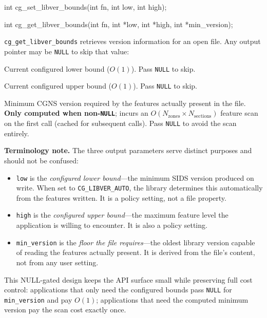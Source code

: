 \documentclass[11pt,letterpaper]{article}
\makeatletter
\let\cgns@orig@lstlisting\lstlisting
\let\cgns@endorig@lstlisting\endlstlisting
\renewenvironment{lstlisting}
  {\par\needspace{5\baselineskip}\nolinenumbers\cgns@orig@lstlisting}
  {\cgns@endorig@lstlisting\par\linenumbers}
\makeatother
\begin{document}
\begin{lstlisting}[language=C]
int cg_set_libver_bounds(int fn,
                               int low, int high);

int cg_get_libver_bounds(int fn,
                               int *low, int *high,
                               int *min_version);
\end{lstlisting}

\texttt{cg\_get\_libver\_bounds} retrieves version information
for an open file.  Any output pointer may be \texttt{NULL} to skip
that value:

\begin{description}[leftmargin=2em, font=\normalfont\ttfamily]
\item[low] Current configured lower bound ($O(1)$).  Pass
  \texttt{NULL} to skip.
\item[high] Current configured upper bound ($O(1)$).  Pass
  \texttt{NULL} to skip.
\item[min\_version] Minimum CGNS version required by the features
  actually present in the file.  \textbf{Only computed when
  non-\texttt{NULL}}; incurs an
  $O(N_{\mathrm{zones}} \times N_{\mathrm{sections}})$ feature scan
  on the first call (cached for subsequent calls).  Pass \texttt{NULL}
  to avoid the scan entirely.
\end{description}

\textbf{Terminology note.}  The three output parameters serve distinct
purposes and should not be confused:
\begin{itemize}[leftmargin=2em]
\item \texttt{low} is the \emph{configured lower bound}---the minimum
  SIDS version produced on write.  When set to
  \texttt{CG\_LIBVER\_AUTO}, the library determines this automatically
  from the features written.  It is a policy setting, not a file
  property.
\item \texttt{high} is the \emph{configured upper bound}---the maximum
  feature level the application is willing to encounter.  It is also
  a policy setting.
\item \texttt{min\_version} is the \emph{floor the file requires}---the
  oldest library version capable of reading the features actually
  present.  It is derived from the file's content, not from any user
  setting.
\end{itemize}

This NULL-gated design keeps the API surface small while preserving
full cost control: applications that only need the configured bounds
pass \texttt{NULL} for \texttt{min\_version} and pay $O(1)$;
applications that need the computed minimum version pay the scan cost
exactly once.
\end{document}
